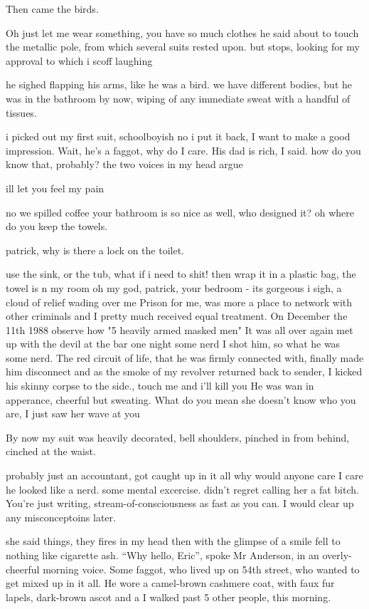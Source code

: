 \documentclass[19pt,openany]{book}
\begin{document}
Then came the birds.

Oh just let me wear something,
you have so much clothes he said
about to touch the metallic pole,
from which several suits rested upon.
but stops, looking for my approval
to which i scoff laughing

he sighed flapping his arms,
like he was a bird.
we have different bodies, but he
was in the bathroom by now, wiping of
any immediate sweat with a handful of
tissues.

i picked out my first suit, schoolboyish
no i put it back, I want to make a good
impression. Wait, he's a faggot, why
do I care. His dad is rich, I said.
how do you know that, probably?
the two voices in my head argue

ill let you feel my pain

no we spilled coffee
your bathroom is so nice as well,
who designed it? oh where do you keep the towels.

patrick, why is there a lock on the toilet.

use the sink, or the tub,
what if i need to shit!
then wrap it in a plastic bag,
the towel is n my room
oh my god, patrick, your bedroom - its gorgeous
i sigh, a cloud of relief wading over me
\newpage
Prison for me, was more a place
to network with other criminals
and I pretty much received
equal treatment.
On December the 11th 1988
observe how
"5 heavily armed masked men"
It was
all over again
met up with the devil
at the bar one night
some nerd
I shot him, so what he was some nerd.
The red circuit of life, that he was
firmly connected with, finally made him disconnect
and as the smoke of my revolver returned back to sender,
I kicked his skinny corpse to the side.,
touch me and i'll kill you
He was wan in apperance, cheerful but sweating.
What do you mean she doesn't know who you are,
I just saw her wave at you

By now my suit was heavily decorated,
bell shoulders, pinched in from behind,
cinched at the waist.

probably just an accountant, got caught up in it
all why would anyone care I care he looked like a nerd.
some mental excercise.
didn't regret calling her a fat bitch.
You’re just writing, stream-of-consciousness as fast as you can.
I would clear up any misconceptoins later.

she said things, they fires in my head
then with the glimpse of a smile
fell to nothing like cigarette ash.
``Why hello, Eric'', spoke Mr Anderson,
in an overly-cheerful morning voice.
Some faggot, who lived up on
54th street,
who wanted to get mixed up in
it all. He wore a
camel-brown cashmere
coat, with faux fur lapels,
dark-brown ascot and a
I walked past 5 other people,
this morning.
\end{document}
